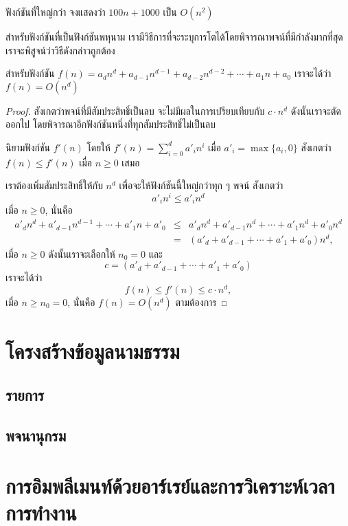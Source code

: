 \begin{quiz}{ฟังก์ชัน{\wbr}ที่{\wbr}ใหญ่{\wbr}กว่า}
จง{\wbr}แสดง{\wbr}ว่า $100n + 1000$ เป็น $O(n^2)$
\end{quiz}

สำหรับ{\wbr}ฟังก์ชัน{\wbr}ที่{\wbr}เป็น{\wbr}ฟังก์ชัน{\wbr}พหุ{\wbr}นาม{\wbr}
เรา{\wbr}มี{\wbr}วิธีการ{\wbr}ที่{\wbr}จะ{\wbr}ระบุ{\wbr}การ{\wbr}โต{\wbr}ได้{\wbr}โดย{\wbr}พิจารณา{\wbr}พจน์{\wbr}ที่{\wbr}มี{\wbr}กำลัง{\wbr}มาก{\wbr}ที่สุด เรา{\wbr}จะ{\wbr}พิสูจน์{\wbr}ว่า{\wbr}วิธี{\wbr}ดังกล่าว{\wbr}ถูกต้อง{\wbr}

\begin{theorem}
สำหรับ{\wbr}ฟังก์ชัน $f(n)=a_dn^d + a_{d-1}n^{d-1} + a_{d-2}n^{d-2} +\cdots +
a_1n + a_0$ เรา{\wbr}จะ{\wbr}ได้{\wbr}ว่า $f(n)=O(n^d)$
\end{theorem}
\begin{proof}
สังเกต{\wbr}ว่า{\wbr}พจน์{\wbr}ที่{\wbr}มี{\wbr}สัมประสิทธิ์{\wbr}เป็น{\wbr}ลบ จะ{\wbr}ไม่{\wbr}มี{\wbr}ผล{\wbr}ใน{\wbr}การ{\wbr}เปรียบเทียบ{\wbr}กับ $c\cdot n^d$
ดังนั้น{\wbr}เรา{\wbr}จะ{\wbr}ตัด{\wbr}ออก{\wbr}ไป โดย{\wbr}พิจารณา{\wbr}อีก{\wbr}ฟังก์ชัน{\wbr}หนึ่ง{\wbr}ที่{\wbr}ทุก{\wbr}สัมประสิทธิ์{\wbr}ไม่{\wbr}เป็น{\wbr}ลบ{\wbr}

นิยาม{\wbr}ฟังก์ชัน $f'(n)$ โดย{\wbr}ให้ $f'(n)=\sum_{i=0}^{d} a'_i n^i$ เมื่อ{\wbr}
$a'_i=\max\{a_i,0\}$ สังเกต{\wbr}ว่า $f(n)\leq f'(n)$ เมื่อ $n \geq 0$ เสมอ{\wbr}

เรา{\wbr}ต้อง{\wbr}เพิ่ม{\wbr}สัมประสิทธิ์{\wbr}ให้{\wbr}กับ $n^d$ เพื่อ{\wbr}จะ{\wbr}ให้{\wbr}ฟังก์ชัน{\wbr}นี้{\wbr}ใหญ่{\wbr}กว่า{\wbr}ทุก ๆ พจน์ สังเกต{\wbr}ว่า{\wbr}
\[
a'_i n^i \leq a'_i n^d
\]
เมื่อ $n\geq 0$, นั่น{\wbr}คือ{\wbr}
\begin{eqnarray*}
a'_d n^d + a'_{d-1}n^{d-1} +\cdots + a'_1n + a'_0 
&\leq&
a'_d n^d + a'_{d-1}n^d +\cdots + a'_1n^d + a'_0n^d\\
&=&
\left(a'_d + a'_{d-1} +\cdots + a'_1 + a'_0\right)n^d,
\end{eqnarray*}
เมื่อ $n\geq 0$ ดังนั้น{\wbr}เรา{\wbr}จะ{\wbr}เลือก{\wbr}ให้ $n_0=0$ และ{\wbr}
\[
c = \left(a'_d + a'_{d-1} +\cdots + a'_1 + a'_0\right)
\]
เรา{\wbr}จะ{\wbr}ได้{\wbr}ว่า{\wbr}
\[
f(n) \leq f'(n) \leq c\cdot n^d,
\]
เมื่อ $n\geq n_0=0$, นั่น{\wbr}คือ $f(n)=O(n^d)$ ตาม{\wbr}ต้องการ{\wbr}
\end{proof}

\section{โครงสร้าง{\wbr}ข้อมูล{\wbr}นามธรรม}

\subsection{รายการ}

\subsection{พจนานุกรม}

\section{การ{\wbr}อิม{\wbr}พลี{\wbr}เมนท์{\wbr}ด้วย{\wbr}อาร์เรย์{\wbr}และ{\wbr}การ{\wbr}วิเคราะห์{\wbr}เวลา{\wbr}การ{\wbr}ทำงาน}
